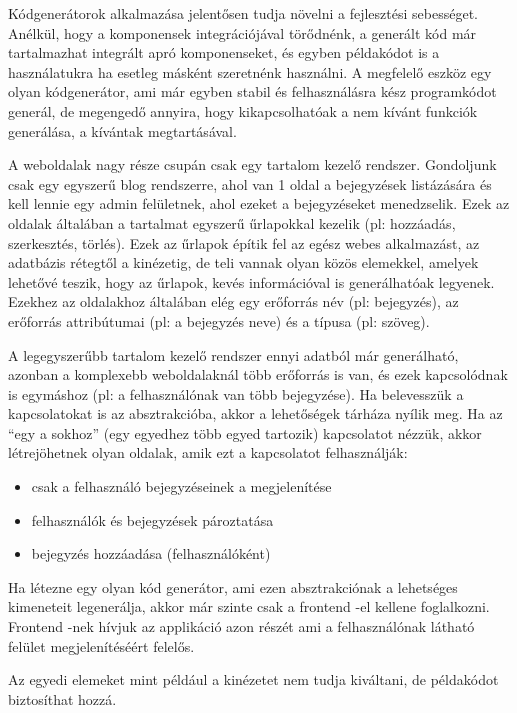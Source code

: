 \documentclass[a4paper,12pt,oneside]{report}
\begin{document}
\begin{justify}

	Kódgenerátorok alkalmazása jelentősen tudja növelni a fejlesztési sebességet. Anélkül, hogy a komponensek integrációjával törődnénk, a generált kód már tartalmazhat integrált apró komponenseket, és egyben példakódot is a használatukra ha esetleg másként szeretnénk használni. A megfelelő eszköz egy olyan kódgenerátor, ami már egyben stabil és felhasználásra kész programkódot generál, de megengedő annyira, hogy kikapcsolhatóak a nem kívánt funkciók generálása, a kívántak megtartásával.

	A weboldalak nagy része csupán csak egy tartalom kezelő rendszer. Gondoljunk csak egy egyszerű blog rendszerre, ahol van 1 oldal a bejegyzések listázására és kell lennie egy admin felületnek, ahol ezeket a bejegyzéseket menedzselik. Ezek az oldalak általában a tartalmat egyszerű űrlapokkal kezelik (pl: hozzáadás, szerkesztés, törlés). Ezek az űrlapok építik fel az egész webes alkalmazást, az adatbázis rétegtől a kinézetig, de teli vannak olyan közös elemekkel, amelyek lehetővé teszik, hogy az űrlapok, kevés információval is generálhatóak legyenek. Ezekhez az oldalakhoz általában elég egy erőforrás név (pl: bejegyzés), az erőforrás attribútumai (pl: a bejegyzés neve) és a típusa (pl: szöveg). 

	A legegyszerűbb tartalom kezelő rendszer ennyi adatból már generálható, azonban a komplexebb weboldalaknál több erőforrás is van, és ezek kapcsolódnak is egymáshoz (pl: a felhasználónak van több bejegyzése). Ha belevesszük a kapcsolatokat is az absztrakcióba, akkor a lehetőségek tárháza nyílik meg. Ha az “egy a sokhoz” (egy egyedhez több egyed tartozik) kapcsolatot nézzük, akkor létrejöhetnek olyan oldalak, amik ezt a kapcsolatot felhasználják:

	\begin{itemize}
		\item csak a felhasználó bejegyzéseinek a megjelenítése
		\item felhasználók és bejegyzések pároztatása
		\item bejegyzés hozzáadása (felhasználóként)
	\end{itemize}

	Ha létezne egy olyan kód generátor, ami ezen absztrakciónak a lehetséges kimeneteit legenerálja, akkor már szinte csak a frontend -el kellene foglalkozni. Frontend -nek hívjuk az applikáció azon részét ami a felhasználónak látható felület megjelenítéséért felelős. 

	Az egyedi elemeket mint például a kinézetet nem tudja kiváltani, de példakódot biztosíthat hozzá.


\end{justify}
\end{document}
